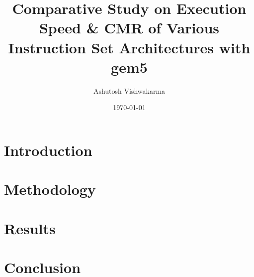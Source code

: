 \documentclass[12pt]{article}
\title{Comparative Study on Execution Speed \& CMR of Various Instruction Set Architectures with gem5}
\author{Ashutosh Vishwakarma}
\date{\today}
\begin{document}
\maketitle

\newpage

%  

\section{Introduction}


\section{Methodology}
 

\section{Results}


\section{Conclusion}


% 
% 
\end{document}
